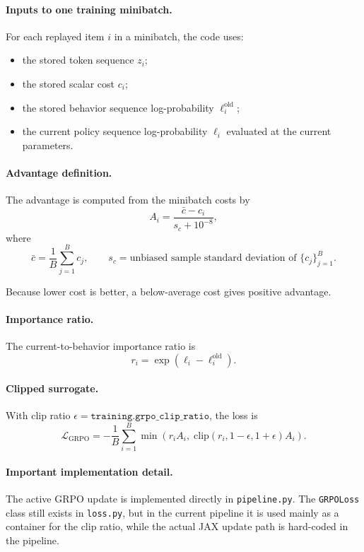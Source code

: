 \documentclass[11pt]{article}
\begin{document}
\paragraph{Inputs to one training minibatch.}
For each replayed item $i$ in a minibatch, the code uses:
\begin{itemize}[leftmargin=*]
\item the stored token sequence $z_i$;
\item the stored scalar cost $c_i$;
\item the stored behavior sequence log-probability $\ell_i^{\mathrm{old}}$;
\item the current policy sequence log-probability $\ell_i$ evaluated at the current parameters.
\end{itemize}

\paragraph{Advantage definition.}
The advantage is computed from the minibatch costs by
\[
A_i
=
\frac{\bar c - c_i}{s_c + 10^{-8}},
\]
where
\[
\bar c = \frac{1}{B}\sum_{j=1}^B c_j,
\qquad
s_c = \text{unbiased sample standard deviation of } \{c_j\}_{j=1}^B.
\]

Because lower cost is better, a below-average cost gives positive advantage.

\paragraph{Importance ratio.}
The current-to-behavior importance ratio is
\[
r_i = \exp(\ell_i - \ell_i^{\mathrm{old}}).
\]

\paragraph{Clipped surrogate.}
With clip ratio $\epsilon = \texttt{training.grpo\_clip\_ratio}$, the loss is
\[
\mathcal{L}_{\mathrm{GRPO}}
=
-\frac{1}{B}\sum_{i=1}^{B}
\min\!\left(
r_i A_i,\;
\mathrm{clip}(r_i,1-\epsilon,1+\epsilon)A_i
\right).
\]

\paragraph{Important implementation detail.}
The active GRPO update is implemented directly in \texttt{pipeline.py}. The \texttt{GRPOLoss} class still exists in \texttt{loss.py}, but in the current pipeline it is used mainly as a container for the clip ratio, while the actual JAX update path is hard-coded in the pipeline.
\end{document}
